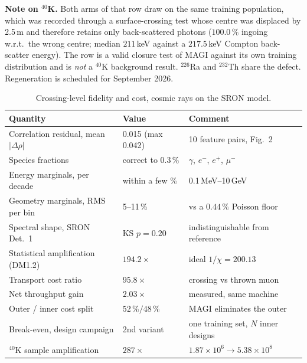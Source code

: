 \begin{table}[t]
\vspace{2mm}
{\footnotesize \textbf{Note on $^{40}$K.} Both arms of that row draw on the same
training population, which was recorded through a surface-crossing test whose
centre was displaced by 2.5\,m and therefore retains only back-scattered photons
($100.0\,\%$ ingoing w.r.t.\ the wrong centre; median $211$\,keV against a
$217.5$\,keV Compton back-scatter energy). The row is a valid closure test of
MAGI against its own training distribution and is \emph{not} a $^{40}$K
background result. $^{226}$Ra and $^{232}$Th share the defect. Regeneration is
scheduled for September 2026.}

\caption{Crossing-level fidelity and cost, cosmic rays on the SRON model.}
\label{tab:fidelity}
\begin{tabular}{lll}
\hline\hline
Quantity & Value & Comment \\
\hline
Correlation residual, mean $|\Delta\rho|$ & 0.015 (max 0.042) & 10 feature pairs, Fig.~2 \\
Species fractions & correct to $0.3\,\%$ & $\gamma$, $e^{-}$, $e^{+}$, $\mu^{-}$ \\
Energy marginals, per decade & within a few \% & 0.1\,MeV--10\,GeV \\
Geometry marginals, RMS per bin & 5--11\,\% & vs a $0.44\,\%$ Poisson floor \\
Spectral shape, SRON Det.~1 & KS $p = 0.20$ & indistinguishable from reference \\
\hline
Statistical amplification (DM1.2) & $194.2\times$ & ideal $1/\chi = 200.13$ \\
Transport cost ratio & $95.8\times$ & crossing vs thrown muon \\
Net throughput gain & $2.03\times$ & measured, same machine \\
Outer / inner cost split & $52\,\% / 48\,\%$ & MAGI eliminates the outer \\
Break-even, design campaign & 2nd variant & one training set, $N$ inner designs \\
$^{40}$K sample amplification & $287\times$ & $1.87\times10^{6} \to 5.38\times10^{8}$ \\
\hline\hline
\end{tabular}
\end{table}
